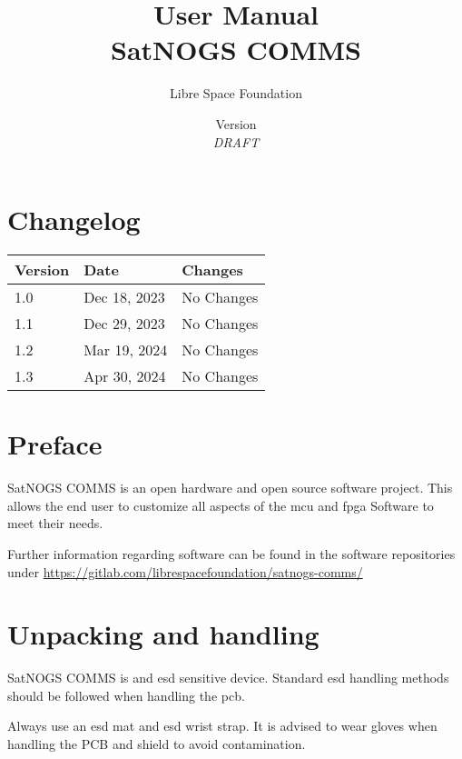\documentclass[english,title,a4paper]{report}
\title{
  User Manual \\
  \large{SatNOGS COMMS} \\
}
\author{Libre Space Foundation}
\date{Version \version\\\textit{DRAFT}}
\begin{document}
\hypersetup{pageanchor=false}
\maketitle
\hypersetup{pageanchor=true}
\tableofcontents
\newpage

\chapter{Changelog}

\begin{tabular}{llp{6.5cm}}
    \toprule
    Version & Date          & Changes                                     \\ \midrule
    1.0     & Dec 18, 2023  & No Changes                                  \\ \midrule
    1.1     & Dec 29, 2023  & No Changes                                  \\ \midrule
    1.2     & Mar 19, 2024  & No Changes                                  \\ \midrule
    1.3     & Apr 30, 2024  & No Changes                                  \\ \bottomrule
\end{tabular}

\chapter{Preface}\label{preface}

SatNOGS COMMS is an open hardware and open source software project.
This allows the end user to customize all aspects of the \acrshort{mcu} and \acrshort{fpga} Software to meet their needs.

Further information regarding software can be found in the software repositories under
\url{https://gitlab.com/librespacefoundation/satnogs-comms/}

\chapter{Unpacking and handling}\label{unpacking-and-handling}

SatNOGS COMMS is and \acrshort{esd} sensitive device.
Standard \acrshort{esd} handling methods should be followed when handling the \acrshort{pcb}\@.

Always use an \acrshort{esd} mat and \acrshort{esd} wrist strap.
It is advised to wear gloves when handling the PCB and shield to avoid contamination.
\end{document}
